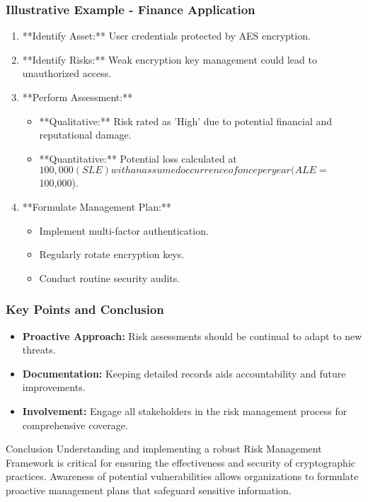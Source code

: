 \documentclass{beamer}
\begin{document}
\begin{frame}[fragile]
    \frametitle{Illustrative Example - Finance Application}
    \begin{enumerate}
        \item **Identify Asset:** User credentials protected by AES encryption.
        \item **Identify Risks:** Weak encryption key management could lead to unauthorized access.
        \item **Perform Assessment:**
        \begin{itemize}
            \item **Qualitative:** Risk rated as 'High' due to potential financial and reputational damage.
            \item **Quantitative:** Potential loss calculated at $100,000 (SLE) with an assumed occurrence of once per year (ALE = $100,000).
        \end{itemize}
        \item **Formulate Management Plan:**
        \begin{itemize}
            \item Implement multi-factor authentication.
            \item Regularly rotate encryption keys.
            \item Conduct routine security audits.
        \end{itemize}
    \end{enumerate}
\end{frame}

\begin{frame}[fragile]
    \frametitle{Key Points and Conclusion}
    \begin{itemize}
        \item \textbf{Proactive Approach:} Risk assessments should be continual to adapt to new threats.
        \item \textbf{Documentation:} Keeping detailed records aids accountability and future improvements.
        \item \textbf{Involvement:} Engage all stakeholders in the risk management process for comprehensive coverage.
    \end{itemize}

    \begin{block}{Conclusion}
        Understanding and implementing a robust Risk Management Framework is critical for ensuring the effectiveness and security of cryptographic practices. Awareness of potential vulnerabilities allows organizations to formulate proactive management plans that safeguard sensitive information.
    \end{block}
\end{frame}
\end{document}
